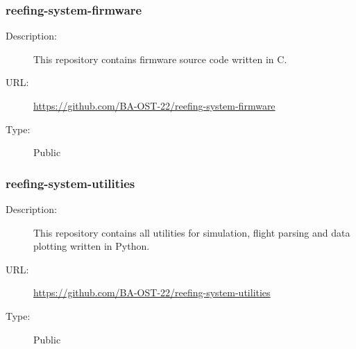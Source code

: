 \subsubsection{reefing-system-firmware} \vspace{-0.2cm}
\begin{description}
  \item[Description:] This repository contains firmware source code written in C.\vspace{-0.25cm}
  \item[URL:] \url{https://github.com/BA-OST-22/reefing-system-firmware}\vspace{-0.25cm}
  \item[Type:] Public\vspace{-0.25cm}
\end{description}

\subsubsection{reefing-system-utilities} \vspace{-0.2cm}
\begin{description}
  \item[Description:] This repository contains all utilities for simulation, flight parsing and data plotting written in Python.\vspace{-0.25cm}
  \item[URL:] \url{https://github.com/BA-OST-22/reefing-system-utilities}\vspace{-0.25cm}
  \item[Type:] Public\vspace{-0.25cm}
\end{description}
